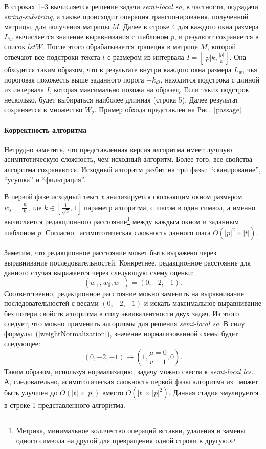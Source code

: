 В строках 1--3 вычисляется решение задачи \emph{semi-local sa}, в частности, подзадачи \emph{string-substring}, а также происходит операция транспонирования, полученной матрицы, для получения матрицы $M$.
Далее в строке 4 для каждого окна размера $L_{w}$ вычисляется значение выравнивания с шаблоном $p$, и результат сохраняется в список $lstW$.
После этого обрабатывается трапеция в матрице $M$, которой отвечают все подстроки текста $t$ с размером из интервала $I=[|p|k,\frac{|p|}{k}]$.
Она обходится таким образом, что в результате внутри каждого окна размера $L_{w}$, чья пороговая похожесть выше заданного порога $-k_{di}$, находится подстрока с длиной из интервала $I$, которая максимально похожа на образец.
Если таких подстрок несколько, будет выбираться наиболее длинная (строка 5).
Далее результат сохраняется в множество $W_{2}$.
Пример обхода представлен на Рис.~\ref{passage}.

\paragraph*{Корректность алгоритма}\mbox{}

Нетрудно заметить, что представленная версия алгоритма имеет лучшую асимптотическую сложность, чем исходный алгоритм.
Более того, все свойства алгоритма сохраняются.
Исходный алгоритм разбит на три фазы: ``сканирование'', ``усушка'' и ``фильтрация''.

В первой фазе исходный текст $t$ анализируется скользящим окном размером $w_{s} = \frac{|p|}{k}$, где $k \in [\frac{1}{\sqrt{3}},1]$ параметр алгоритма, с шагом в один символ, а именно вычисляется редакционного расстояние\footnote{Метрика, минимальное количество операций вставки, удаления и замены одного символа на другой для превращения одной строки в другую.} между каждым окном и заданным шаблоном $p$.
Согласно~\cite{luciv2019interactive} асимптотическая сложность данного шага $O(|p|^2 \times |t|)$.

Заметим, что редакционное расстояние может быть выражено через выравнивание последовательностей.
Конкретнее, редакционное расстояние для данного случая выражается через следующую схему оценки:
\begin{equation}\label{weightAppr}
    (w_{+},w_{0},w_{-}) = (0,-2,-1).
\end{equation}
Соответственно, редакционное расстояние можно заменить на выравнивание последовательностей с весами $(0,-2,-1)$ и искать максимальное выравнивание без потери свойств алгоритма в силу эквивалентности двух задач.
Из этого следует, что можно применить алгоритмы для решения \emph{semi-local sa}.
В силу формулы~(\ref{weightNormalization}), значение нормализованной схемы будет следующее:
\begin{equation}
    (0, -2, -1) \rightarrow (1,\frac{\mu=0}{v=1}, 0).
\end{equation}
Таким образом, используя нормализацию, задачу можно свести к \emph{semi-local lcs}.
А, следовательно, асимптотическая сложность первой фазы алгоритма из~\cite{luciv2019interactive} может быть улучшен до $O(|t| \times |p|)$ вместо $O(|t| \times |p|^2)$.
Данная стадия эмулируется в строке 1 представленного алгоритма.

